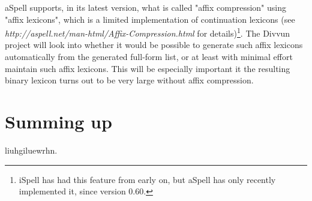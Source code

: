 \documentclass[a4paper,english]{article}
\begin{document}
aSpell supports, in its latest version, what is called "affix compression" using "affix lexicons", which is a limited implementation of continuation lexicons (see \textit{http://aspell.net/man-html/Affix-Compression.html} for details)\footnote{iSpell has had this feature from early on, but aSpell has only recently implemented it, since version 0.60.}. The Divvun project will look into whether it would be possible to generate such affix lexicons automatically from the generated full-form list, or at least with minimal effort maintain such affix lexicons. This will be especially important it the resulting binary lexicon turns out to be very large without affix compression.

\section{Summing up}

liuhgiluewrhn.

 



\end{document}
